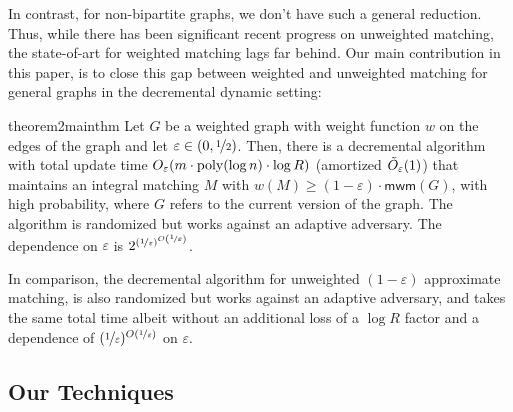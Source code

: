\documentclass[a4paper,11pt]{article}
\newcommand{\paren}[1]{\left ( #1 \right )}
\newcommand{\poly}{\mbox{\rm poly}}
\newcommand{\eps}{\varepsilon}
\theoremstyle{definition}
\theoremstyle{definition}
\theoremstyle{definition}
\theoremstyle{definition}
\newtheorem{theorem2}[definition2]{Theorem}
\theoremstyle{definition}
\theoremstyle{definition}
\theoremstyle{definition}
\theoremstyle{definition}
\theoremstyle{definition}
\theoremstyle{definition}
\theoremstyle{definition}
\theoremstyle{definition}
\theoremstyle{definition}
\theoremstyle{definition}
\theoremstyle{definition}
\begin{document}
In contrast, for non-bipartite graphs, we don’t have such a general reduction. Thus, while there has been significant recent progress on unweighted matching, the state-of-art for weighted matching lags far behind. Our main contribution in this paper, is to close this gap between weighted and unweighted matching for general graphs in the decremental dynamic setting:




\begin{restatable}{theorem2}{mainthm}\label{thm:main}
Let $G$ be a weighted graph with weight function $w$ on the edges of the graph and let $\eps\in (0,\nicefrac{1}{2})$. Then, there is a decremental algorithm with total update time $O_{\varepsilon}(m\cdot\poly(\log n)\cdot\log R)$ (amortized $\Tilde{O}_{\varepsilon}(1)$) that maintains an integral matching $M$ with $w(M)\geqslant (1-\varepsilon)\cdot \textsf{mwm}(G)$, with high probability, where $G$ refers to the current version of the graph. The algorithm is randomized but works against an adaptive adversary. The dependence on $\eps$ is $2^{{\paren{\nicefrac{1}{\varepsilon}}}^{O\paren{\nicefrac{1}{\varepsilon}}}}$.
\end{restatable}


In comparison, the decremental algorithm for unweighted $(1-\eps)$ approximate matching, is also randomized but works against an adaptive adversary, and takes the same total time albeit without an additional loss of a $\log R$ factor and a dependence of $(\nicefrac{1}{\eps})^{O(\nicefrac{1}{\eps})}$ on $\eps$. 


\subsection{Our Techniques}
\end{document}
